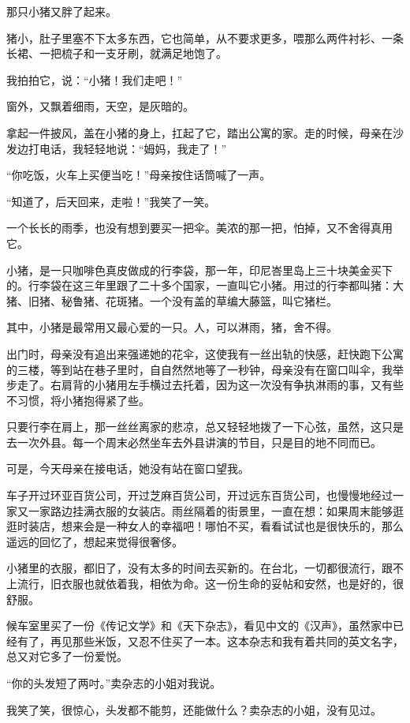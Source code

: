\par 那只小猪又胖了起来。
\par 猪小，肚子里塞不下太多东西，它也简单，从不要求更多，喂那么两件衬衫、一条长裙、一把梳子和一支牙刷，就满足地饱了。
\par 我拍拍它，说：“小猪！我们走吧！”
\par 窗外，又飘着细雨，天空，是灰暗的。
\par 拿起一件披风，盖在小猪的身上，扛起了它，踏出公寓的家。走的时候，母亲在沙发边打电话，我轻轻地说：“姆妈，我走了！”
\par “你吃饭，火车上买便当吃！”母亲按住话筒喊了一声。
\par “知道了，后天回来，走啦！”我笑了一笑。
\par 一个长长的雨季，也没有想到要买一把伞。美浓的那一把，怕掉，又不舍得真用它。
\par 小猪，是一只咖啡色真皮做成的行李袋，那一年，印尼峇里岛上三十块美金买下的。行李袋在这三年里跟了二十多个国家，一直叫它小猪。用过的行李都叫猪：大猪、旧猪、秘鲁猪、花斑猪。一个没有盖的草编大藤篮，叫它猪栏。
\par 其中，小猪是最常用又最心爱的一只。人，可以淋雨，猪，舍不得。
\par 出门时，母亲没有追出来强递她的花伞，这使我有一丝出轨的快感，赶快跑下公寓的三楼，等到站在巷子里时，自自然然地等了一秒钟，母亲没有在窗口叫伞，我举步走了。右肩背的小猪用左手横过去托着，因为这一次没有争执淋雨的事，又有些不习惯，将小猪抱得紧了些。
\par 只要行李在肩上，那一丝丝离家的悲凉，总又轻轻地拨了一下心弦，虽然，这只是去一次外县。每一个周末必然坐车去外县讲演的节目，只是目的地不同而已。
\par 可是，今天母亲在接电话，她没有站在窗口望我。
\par 车子开过环亚百货公司，开过芝麻百货公司，开过远东百货公司，也慢慢地经过一家又一家路边挂满衣服的女装店。雨丝隔着的街景里，一直在想：如果周末能够逛逛时装店，想来会是一种女人的幸福吧！哪怕不买，看看试试也是很快乐的，那么遥远的回忆了，想起来觉得很奢侈。
\par 小猪里的衣服，都旧了，没有太多的时间去买新的。在台北，一切都很流行，跟不上流行，旧衣服也就依着我，相依为命。这一份生命的妥帖和安然，也是好的，很舒服。
\par 候车室里买了一份《传记文学》和《天下杂志》，看见中文的《汉声》，虽然家中已经有了，再见那些米饭，又忍不住买了一本。这本杂志和我有着共同的英文名字，总又对它多了一份爱悦。
\par “你的头发短了两吋。”卖杂志的小姐对我说。
\par 我笑了笑，很惊心，头发都不能剪，还能做什么？卖杂志的小姐，没有见过。
